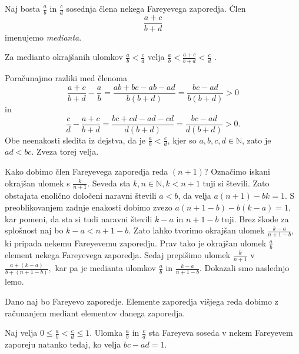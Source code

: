 \documentclass[mat1]{fmfdelo}
\begin{document}
%
\begin{definicija}
Naj bosta $\frac{a}{b}$ in $\frac{c}{d}$ sosednja člena nekega Fareyevega zaporedja. Člen \[\frac{a+c}{b+d} \] imenujemo \emph{medianta}.
\end{definicija}

\begin{trditev}
Za medianto okrajšanih ulomkov \(\frac{a}{b} < \frac{c}{d}\) velja  \(\frac{a}{b} < \frac{a+c}{b+d} < \frac{c}{d}\) .
\end{trditev}

\begin{dokaz}
Poračunajmo razliki med členoma
\[\frac{a+c}{b+d} - \frac{a}{b} = \frac{ab+bc-ab-ad}{b(b+d)} = \frac{bc-ad}{b(b+d)} > 0\] in
\[\frac{c}{d} - \frac{a+c}{b+d} = \frac{bc+cd-ad-cd}{d(b+d)} = \frac{bc-ad}{d(b+d)} > 0.\]
Obe neenakosti sledita iz dejstva, da je \(\frac{a}{b} < \frac{c}{d}\), kjer so \(a, b, c, d \in \mathbb{N} \), zato je \( ad < bc.\)
Zveza torej velja. 
\end{dokaz}

%
Kako dobimo člen Fareyevega zaporedja reda $(n+1)$?
Označimo iskani okrajšan ulomek s $\frac{k}{n+1}$. Seveda sta $k, n \in\mathbb{N}, k < n+1$ tuji si števili. Zato obstajata enolično določeni naravni števili $a < b$, da velja $a(n+1)-bk=1.$ S preoblikovanjem zadnje enakosti dobimo zvezo $a(n+1-b)-b(k-a)=1,$ kar pomeni, da sta si tudi naravni števili $k-a$ in $n+1-b$ tuji. Brez škode za splošnost naj bo $k-a<n+1-b.$ Zato lahko tvorimo okrajšan ulomek $\frac{k-a}{n+1-b}$, ki pripada nekemu Fareyevemu zaporedju. Prav tako je okrajšan ulomek $\frac{a}{b}$ element nekega Fareyevega zaporedja. Sedaj prepišimo ulomek $\frac{k}{n+1}$ v $\frac{a+(k-a)}{b+(n+1-b)},$ kar pa je medianta ulomkov $\frac{a}{b}$ in $\frac{k-a}{n+1-b}.$ Dokazali smo naslednjo lemo.

\begin{lema}
Dano naj bo Fareyevo zaporedje. Elemente zaporedja višjega reda dobimo z računanjem mediant elementov danega zaporedja.
\end{lema}

\begin{trditev}
Naj velja \( 0 \leq \frac{a}{b} < \frac{c}{d} \leq 1\). Ulomka $\frac{a}{b}$ in $\frac{c}{d}$ sta Fareyeva soseda v nekem Fareyevem zaporeju natanko tedaj, ko velja \(bc - ad = 1\).
\end{trditev}
\end{document}
